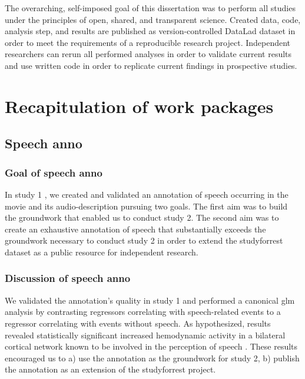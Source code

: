 The overarching, self-imposed goal of this dissertation was to perform all
studies under the principles of open, shared, and transparent science.
Created data, code, analysis step, and results are published as
version-controlled DataLad
\citep[\href{www.datalad.org}{datalad.org};][]{halchenko2021datalad} dataset in
order to meet the requirements of a reproducible research project.
Independent researchers can rerun all performed analyses in order to validate
current results and use written code in order to replicate current findings
in prospective studies.



\section{Recapitulation of work packages}



\subsection{Speech anno}


\subsubsection{Goal of speech anno}

In study 1 \citep{haeusler2021speechanno}, we created and validated an
annotation of speech occurring in the movie and its audio-description pursuing
two goals.
The first aim was to build the groundwork that enabled us to conduct study 2.
The second aim was to create an exhaustive annotation of speech that
substantially exceeds the groundwork necessary to conduct study 2 in order to
extend the studyforrest dataset as a public resource for independent research.


\subsubsection{Discussion of speech anno}

We validated the annotation's quality in study 1 and performed a canonical
\ac{glm} analysis by contrasting regressors correlating with speech-related
events to a regressor correlating with events without speech.
As hypothesized, results revealed statistically significant increased
hemodynamic activity in a bilateral cortical network known to be involved in the
perception of speech \citep[e.g.,][]{friederici2011brain, wilson2008beyond}.
These results encouraged us to a) use the annotation as the groundwork for study
2, b) publish the annotation as an extension of the studyforrest project.


